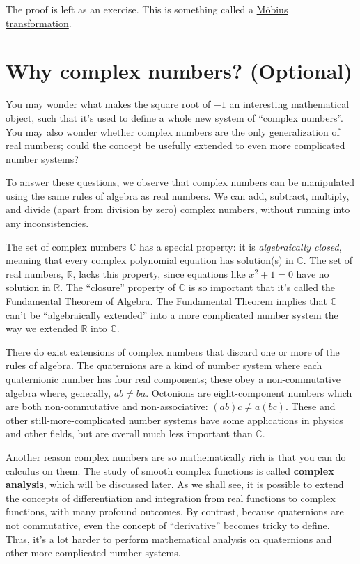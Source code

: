\documentclass[10pt,a4paper]{article}
\begin{document}
\noindent
The proof is left as an exercise. This is something called a
\href{http://en.wikipedia.org/wiki/M\%C3\%B6bius_transformation}{M\"obius
  transformation}.

\section{Why complex numbers? (Optional)}\label{why-complex-numbers-optional}

You may wonder what makes the square root of $-1$ an interesting
mathematical object, such that it's used to define a whole new system
of ``complex numbers''. You may also wonder whether complex numbers
are the only generalization of real numbers; could the concept be
usefully extended to even more complicated number systems?

To answer these questions, we observe that complex numbers can be
manipulated using the same rules of algebra as real numbers. We can
add, subtract, multiply, and divide (apart from division by zero)
complex numbers, without running into any inconsistencies.

The set of complex numbers $\mathbb{C}$ has a special property: it is
\emph{algebraically closed}, meaning that every complex polynomial
equation has solution(s) in $\mathbb{C}$. The set of real numbers,
$\mathbb{R}$, lacks this property, since equations like $x^2 + 1 = 0$
have no solution in $\mathbb{R}$. The ``closure'' property of
$\mathbb{C}$ is so important that it's called the
\href{https://en.wikipedia.org/wiki/Fundamental_theorem_of_algebra}{Fundamental
  Theorem of Algebra}. The Fundamental Theorem implies that
$\mathbb{C}$ can't be ``algebraically extended'' into a more
complicated number system the way we extended $\mathbb{R}$ into
$\mathbb{C}$.

There do exist extensions of complex numbers that discard one or more of
the rules of algebra. The
\href{https://en.wikipedia.org/wiki/Quaternion}{quaternions} are a kind
of number system where each quaternionic number has four real
components; these obey a non-commutative algebra where, generally,
$ab \ne ba$. \href{https://en.wikipedia.org/wiki/Octonion}{Octonions}
are eight-component numbers which are both non-commutative and
non-associative: $(ab)c \ne a(bc)$. These and other
still-more-complicated number systems have some applications in physics
and other fields, but are overall much less important than
$\mathbb{C}$.

Another reason complex numbers are so mathematically rich is that you
can do calculus on them. The study of smooth complex functions is
called \textbf{complex analysis}, which will be discussed later. As we
shall see, it is possible to extend the concepts of differentiation
and integration from real functions to complex functions, with many
profound outcomes. By contrast, because quaternions are not
commutative, even the concept of ``derivative'' becomes tricky to
define. Thus, it's a lot harder to perform mathematical analysis on
quaternions and other more complicated number systems.
\end{document}
